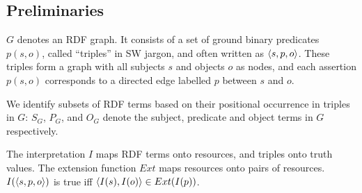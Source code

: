 \subsection{Preliminaries}
\label{sec:preliminaries}

$G$ denotes an RDF graph. It consists of a set of ground binary
predicates $p(s,o)$, called ``triples'' in SW jargon, and often
written as $\langle s,p,o\rangle$. These triples form a graph with all
subjects $s$ and objects $o$ as nodes, and
each assertion $p(s,o)$ corresponds to a directed edge labelled $p$
between $s$ and $o$.

We identify subsets of RDF terms based on
  their positional occurrence in triples in $G$:
  $S_G$, $P_G$, and $O_G$ denote the subject, predicate and object terms
  in $G$ respectively.

The interpretation $I$ maps RDF terms onto resources,
  and triples onto truth values.
The extension function $Ext$ maps resources onto pairs of resources.
$I(\langle s,p,o\rangle)$ is true iff
  $\langle I(s),I(o)\rangle \in Ext(I(p))$.\cite{Hayes2004}

